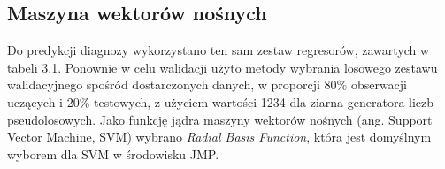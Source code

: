 


\subsection{Maszyna wektorów nośnych}

Do predykcji diagnozy wykorzystano ten sam zestaw regresorów, zawartych w tabeli 3.1. Ponownie w celu walidacji użyto metody wybrania losowego zestawu walidacyjnego spośród dostarczonych danych, w proporcji 80\% obserwacji uczących i 20\% testowych, z użyciem wartości 1234 dla ziarna generatora liczb pseudolosowych. Jako funkcję jądra maszyny wektorów nośnych (ang. Support Vector Machine, SVM) wybrano \textit{Radial Basis Function}, która jest domyślnym wyborem dla SVM w środowisku JMP. 

